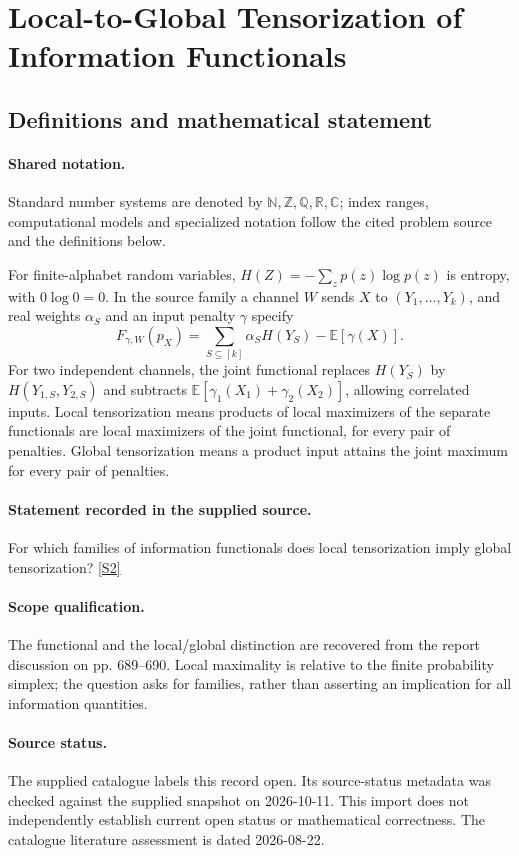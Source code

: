 \documentclass[11pt]{article}
\newcommand{\sref}[2]{\hyperlink{source:#1:#2}{[S#2]}}
\begin{document}
\section{Local-to-Global Tensorization of Information Functionals}\label{statement}

\subsection{Definitions and mathematical statement}

\paragraph{Shared notation.}Standard number systems are denoted by $\mathbb N,\mathbb Z,\mathbb Q,\mathbb R,\mathbb C$; index ranges, computational models and specialized notation follow the cited problem source and the definitions below.


For finite-alphabet random variables, $H(Z)=-\sum_z p(z)\log p(z)$ is entropy, with $0\log0=0$. In the source family a channel $W$ sends $X$ to $(Y_1,\ldots,Y_k)$, and real weights $\alpha_S$ and an input penalty $\gamma$ specify
\[F_{\gamma,W}(p_X)=\sum_{S\subseteq[k]}\alpha_S H(Y_S)-\mathbb E[\gamma(X)].\]
For two independent channels, the joint functional replaces $H(Y_S)$ by $H(Y_{1,S},Y_{2,S})$ and subtracts $\mathbb E[\gamma_1(X_1)+\gamma_2(X_2)]$, allowing correlated inputs. Local tensorization means products of local maximizers of the separate functionals are local maximizers of the joint functional, for every pair of penalties. Global tensorization means a product input attains the joint maximum for every pair of penalties.
\paragraph{Statement recorded in the supplied source.}
For which families of information functionals does local tensorization imply global tensorization? \sref{statement}{2}
\paragraph{Scope qualification.}
The functional and the local/global distinction are recovered from the report discussion on pp. 689--690. Local maximality is relative to the finite probability simplex; the question asks for families, rather than asserting an implication for all information quantities.
\paragraph{Source status.}
The supplied catalogue labels this record open. Its source-status metadata was checked against the supplied snapshot on 2026-10-11. This import does not independently establish current open status or mathematical correctness. The catalogue literature assessment is dated 2026-08-22.
\end{document}
